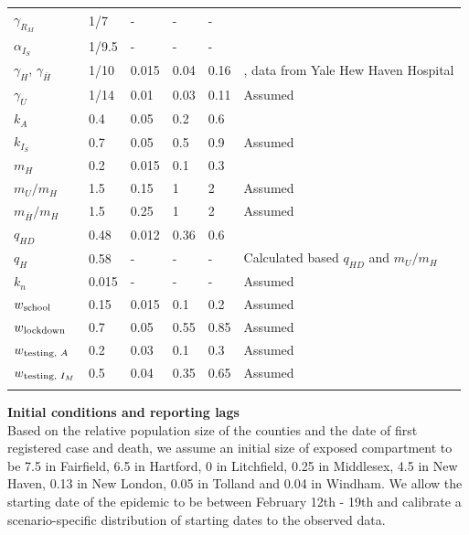 \documentclass[11pt]{article}
\begin{document}
\begin{table}[!htb]
\begin{tabular}{p{} p{} p{} p{} p{} p{} }
		$\gamma_{R_M}$ & 1/7 & {-} & {-} & {-} & \citep{wolfel2020virological, cdc2020isolation} \\[0.5em]
		$\alpha_{I_S}$ & 1/9.5 & {-} & {-} & {-} & \citep{verity2020estimates, lewnard2020incidence, garg2020hospitalization, perez2020clinical} \\[0.5em]
		$\gamma_H$, $\gamma_{\bar{H}}$ & 1/10 & 0.015 & 0.04 & 0.16 & \citep{lane2020country, lewnard2020incidence, paranjpe2020clinical, gold2020characteristics}, data from Yale Hew Haven Hospital \\[0.5em]
		$\gamma_U$ & 1/14 & 0.01 & 0.03 & 0.11 & Assumed \\[0.5em]
		$k_A$ & 0.4 & 0.05 & 0.2 & 0.6 & \citep{salomon2020defining, ferguson2020impact} \\[0.5em]
		$k_{I_S}$ &  0.7 & 0.05 & 0.5 & 0.9 & Assumed \\[0.5em]
		$m_H$ & 0.2 & 0.015 & 0.1 & 0.3 & \citep{lane2020country, lewnard2020incidence, paranjpe2020clinical, petrilli2020factors, verity2020estimates, perez2020clinical, docherty2020features, CHAwebsite} \\[0.5em]
		$m_U / m_H$ & 1.5 & 0.15 & 1 & 2 & Assumed \\[0.5em]
		$m_{\bar{H}} / m_H$ & 1.5 & 0.25 & 1 & 2 & Assumed \\[0.5em]
		$q_{HD}$ & 0.48 & 0.012 & 0.36 & 0.6 & \citep{CHAwebsite, DPHwebsite} \\[0.5em]		
		$q_H$ & 0.58 & {-} & {-} & {-} & {Calculated based $q_{HD}$ and $m_U/m_H$} \\[0.5em]
		$k_n$ & 0.015 & {-} & {-} & {-} & Assumed \\[0.5em]
		$w\textsubscript{school}$ & 0.15 & 0.015 & 0.1 & 0.2 & Assumed \\[0.5em]
		$w\textsubscript{lockdown}$ & 0.7 & 0.05 & 0.55 & 0.85 & Assumed \\[0.5em]
		$w\textsubscript{testing, $A$}$ & 0.2 & 0.03 & 0.1 & 0.3 & Assumed \\[0.5em]
		$w\textsubscript{testing, $I_M$}$ & 0.5 & 0.04 & 0.35 & 0.65 & Assumed \\[0.5em]
		\bottomrule
	\label{table:priors}
	\end{tabular}
	\end{table}
\endgroup



\textbf{Initial conditions and reporting lags}\\[0.5em]
Based on the relative population size of the counties and the date of first registered case and death, we assume an initial size of exposed compartment to be 7.5 in Fairfield, 6.5 in Hartford, 0 in Litchfield, 0.25 in Middlesex, 4.5 in New Haven, 0.13 in New London, 0.05 in Tolland and 0.04 in Windham. We allow the starting date of the epidemic to be between February 12th - 19th and calibrate a scenario-specific distribution of starting dates to the observed data. 
\end{document}
